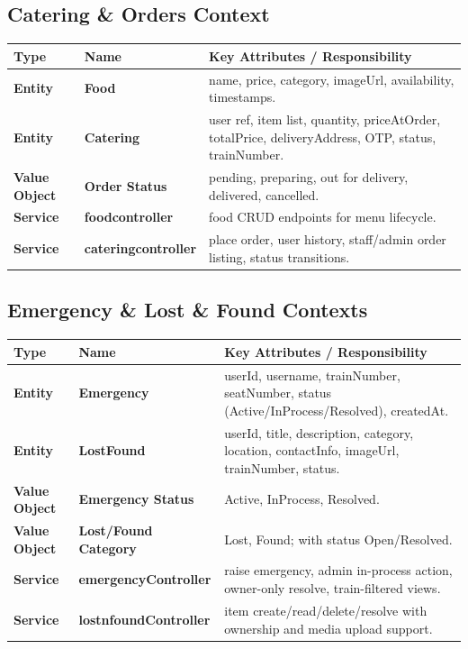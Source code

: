 \documentclass[12pt,a4paper]{report}
\begin{document}
\subsection{Catering \& Orders Context}
\begin{table}[H]
\centering
\begin{tabularx}{\textwidth}{>{\bfseries}p{} >{\bfseries}p{} Y}
\toprule
{}
\textcolor{TableHeaderText}{Type} & \textcolor{TableHeaderText}{Name} & \textcolor{TableHeaderText}{Key Attributes / Responsibility} \\
\midrule
Entity & Food & name, price, category, imageUrl, availability, timestamps. \\
Entity & Catering & user ref, item list, quantity, priceAtOrder, totalPrice, deliveryAddress, OTP, status, trainNumber. \\
Value Object & Order Status & pending, preparing, out for delivery, delivered, cancelled. \\
Service & foodcontroller & food CRUD endpoints for menu lifecycle. \\
Service & cateringcontroller & place order, user history, staff/admin order listing, status transitions. \\
\bottomrule
\end{tabularx}
\end{table}

\subsection{Emergency \& Lost \& Found Contexts}
\begin{table}[H]
\centering
\begin{tabularx}{\textwidth}{>{\bfseries}p{} >{\bfseries}p{} Y}
\toprule
{}
\textcolor{TableHeaderText}{Type} & \textcolor{TableHeaderText}{Name} & \textcolor{TableHeaderText}{Key Attributes / Responsibility} \\
\midrule
Entity & Emergency & userId, username, trainNumber, seatNumber, status (Active/InProcess/Resolved), createdAt. \\
Entity & LostFound & userId, title, description, category, location, contactInfo, imageUrl, trainNumber, status. \\
Value Object & Emergency Status & Active, InProcess, Resolved. \\
Value Object & Lost/Found Category & Lost, Found; with status Open/Resolved. \\
Service & emergencyController & raise emergency, admin in-process action, owner-only resolve, train-filtered views. \\
Service & lostnfoundController & item create/read/delete/resolve with ownership and media upload support. \\
\bottomrule
\end{tabularx}
\end{table}
\end{document}
